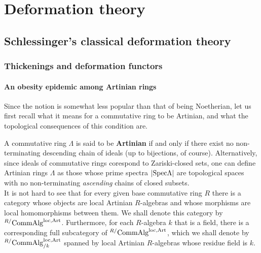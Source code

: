 \chapter{Deformation theory}
    \begin{abstract}
        
    \end{abstract}
    
    \minitoc

    \section{Schlessinger's classical deformation theory}
        \subsection{Thickenings and deformation functors}
            \subsubsection{An obesity epidemic among Artinian rings}
                Since the notion is somewhat less popular than that of being Noetherian, let us first recall what it means for a commutative ring to be Artinian, and what the topological consequences of this condition are.
                
                \begin{definition} \label{def: artinian_rings} 
                    A commutative ring $\Lambda$ is said to be \textbf{Artinian} if and only if there exist no non-terminating descending chain of ideals (up to bijections, of course). Alternatively, since ideals of commutative rings corespond to Zariski-closed sets, one can define Artinian rings $\Lambda$ as those whose prime spectra $|\mathrm{Spec} \Lambda|$ are topological spaces with no non-terminating \textit{ascending} chains of closed subsets. 
                    \\
                    It is not hard to see that for every given base commutative ring $R$ there is a category whose objects are local Artinian $R$-algebras and whose morphisms are local homomorphisms between them. We shall denote this category by ${}^{R/}\mathrm{Comm}\mathrm{Alg}^{\mathrm{loc}, \mathrm{Art}}$. Furthermore, for each $R$-algebra $k$ that is a field, there is a corresponding full subcategory of ${}^{R/}\mathrm{Comm}\mathrm{Alg}^{\mathrm{loc}, \mathrm{Art}}$, which we shall denote by ${}^{R/}\mathrm{Comm}\mathrm{Alg}_{/k}^{\mathrm{loc}, \mathrm{Art}}$ spanned by local Artinian $R$-algebras whose residue field is $k$. 
                \end{definition}
                
